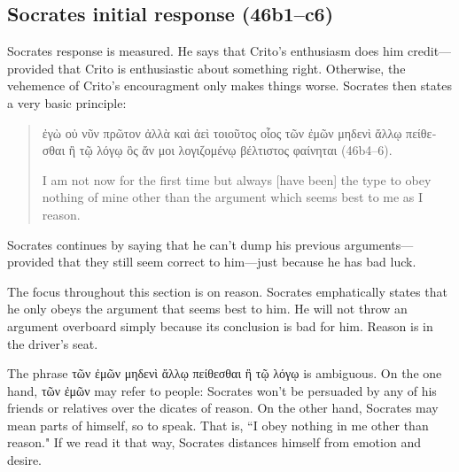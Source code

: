 \documentclass[12pt,letterpaper]{article}
\begin{document}

\subsection*{Socrates initial response (46b1--c6)}

Socrates response is measured. He says that Crito's enthusiasm does him credit---provided that Crito is enthusiastic about something right. Otherwise, the vehemence of Crito's encouragment only makes things worse. Socrates then states a very basic principle:

\begin{quote}
    \textgreek{ἐγὼ οὐ νῦν πρῶτον ἀλλὰ καὶ ἀεὶ τοιοῦτος οἷος τῶν ἐμῶν μηδενὶ ἄλλῳ πείθεσθαι ἢ τῷ λόγῳ ὃς ἄν μοι λογιζομένῳ βέλτιστος φαίνηται} (46b4--6).

    I am not now for the first time but always [have been] the type to obey nothing of mine other than the argument which seems best to me as I reason.
\end{quote}

Socrates continues by saying that he can't dump his previous arguments---provided that they still seem correct to him---just because he has bad luck.

The focus throughout this section is on reason. Socrates emphatically states that he only obeys the argument that seems best to him. He will not throw an argument overboard simply because its conclusion is bad for him. Reason is in the driver's seat.

The phrase \textgreek{τῶν ἐμῶν μηδενὶ ἄλλῳ πείθεσθαι ἢ τῷ λόγῳ} is ambiguous. On the one hand, \textgreek{τῶν ἐμῶν} may refer to people: Socrates won't be persuaded by any of his friends or relatives over the dicates of reason. On the other hand, Socrates may mean parts of himself, so to speak. That is, ``I obey nothing in me other than reason." If we read it that way, Socrates distances himself from emotion and desire. 
\end{document}
